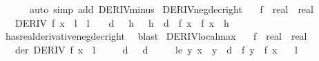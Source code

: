 \begin{isabellebody}
\ \ \ \ \ \ {\isacharparenleft}{\kern0pt}auto\ simp\ add{\isacharcolon}{\kern0pt}\ DERIV{\isacharunderscore}{\kern0pt}minus{\isacharparenright}{\kern0pt}%
\endisatagproof
{\isafoldproof}%
%
\isadelimproof
\isanewline
%
\endisadelimproof
\isanewline
{}\isamarkupfalse%
\ DERIV{\isacharunderscore}{\kern0pt}neg{\isacharunderscore}{\kern0pt}dec{\isacharunderscore}{\kern0pt}right{\isacharcolon}{\kern0pt}\isanewline
\ \ \ f\ {\isacharcolon}{\kern0pt}{\isacharcolon}{\kern0pt}\ {\isachardoublequoteopen}real\ {\isasymRightarrow}\ real{\isachardoublequoteclose}\isanewline
\ \ \ {\isachardoublequoteopen}DERIV\ f\ x\ {\isacharcolon}{\kern0pt}{\isachargreater}{\kern0pt}\ l\ {\isasymLongrightarrow}\ l\ {\isacharless}{\kern0pt}\ {}\ {\isasymLongrightarrow}\ {\isasymexists}d\ {\isachargreater}{\kern0pt}\ {}{\isachardot}{\kern0pt}\ {\isasymforall}h\ {\isachargreater}{\kern0pt}\ {}{\isachardot}{\kern0pt}\ h\ {\isacharless}{\kern0pt}\ d\ {\isasymlongrightarrow}\ f\ x\ {\isachargreater}{\kern0pt}\ f\ {\isacharparenleft}{\kern0pt}x\ {\isacharplus}{\kern0pt}\ h{\isacharparenright}{\kern0pt}{\isachardoublequoteclose}\isanewline
%
\isadelimproof
\ \ %
\endisadelimproof
%
\isatagproof
{}\isamarkupfalse%
\ has{\isacharunderscore}{\kern0pt}real{\isacharunderscore}{\kern0pt}derivative{\isacharunderscore}{\kern0pt}neg{\isacharunderscore}{\kern0pt}dec{\isacharunderscore}{\kern0pt}right\ \isamarkupfalse%
\ blast%
\endisatagproof
{\isafoldproof}%
%
\isadelimproof
\isanewline
%
\endisadelimproof
\isanewline
{}\isamarkupfalse%
\ DERIV{\isacharunderscore}{\kern0pt}local{\isacharunderscore}{\kern0pt}max{\isacharcolon}{\kern0pt}\isanewline
\ \ \ f\ {\isacharcolon}{\kern0pt}{\isacharcolon}{\kern0pt}\ {\isachardoublequoteopen}real\ {\isasymRightarrow}\ real{\isachardoublequoteclose}\isanewline
\ \ \ der{\isacharcolon}{\kern0pt}\ {\isachardoublequoteopen}DERIV\ f\ x\ {\isacharcolon}{\kern0pt}{\isachargreater}{\kern0pt}\ l{\isachardoublequoteclose}\isanewline
\ \ \ \ \ d{\isacharcolon}{\kern0pt}\ {\isachardoublequoteopen}{}\ {\isacharless}{\kern0pt}\ d{\isachardoublequoteclose}\isanewline
\ \ \ \ \ le{\isacharcolon}{\kern0pt}\ {\isachardoublequoteopen}{\isasymforall}y{\isachardot}{\kern0pt}\ {\isasymbar}x\ {\isacharminus}{\kern0pt}\ y{\isasymbar}\ {\isacharless}{\kern0pt}\ d\ {\isasymlongrightarrow}\ f\ y\ {\isasymle}\ f\ x{\isachardoublequoteclose}\isanewline
\ \ \ {\isachardoublequoteopen}l\ {\isacharequal}{\kern0pt}\ {}{\isachardoublequoteclose}\isanewline

\end{isabellebody}
